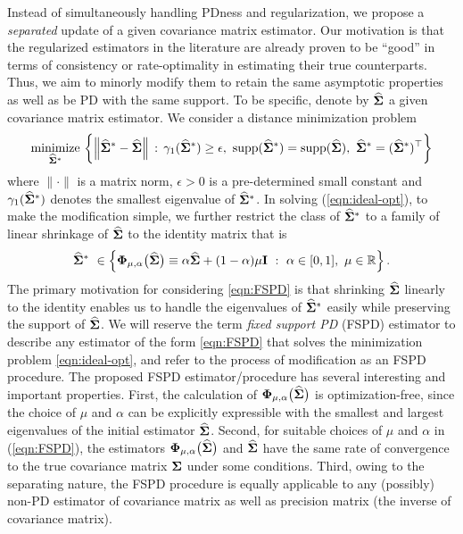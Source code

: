 \documentclass[times,sort&compress,3p]{elsarticle}
\newcommand{\minimize}{\mathop{\rm minimize}}
\begin{document}
Instead of simultaneously handling PDness and regularization, we propose a \emph{separated} update of a given 
covariance matrix estimator. 
Our motivation is that the regularized estimators in the literature are already proven to be ``good'' in terms of
consistency or rate-optimality in estimating their true counterparts. Thus, we aim to
minorly modify them to retain the same asymptotic properties as well as be PD with the same support. To be specific,
denote by $\widehat{\bf \Sigma}$ a given covariance matrix estimator.
We consider a distance minimization problem
\begin{equation} \label{eqn:ideal-opt}
\minimize_{\widehat{\bf \Sigma}^*}\,
\bigg\{ \Big\| \widehat{\bf \Sigma}^* - \widehat{\bf \Sigma} \Big\| \,:\,
	\gamma_{1}(\widehat{\bf \Sigma}^*) \geq \epsilon
	,~ {\rm supp}(\widehat{\bf \Sigma}^*) = {\rm supp}(\widehat{\bf \Sigma})
	, ~ \widehat{\bf \Sigma}^* = (\widehat{\bf \Sigma}^*)^{\top}
\bigg\}
\end{equation}
where $\|\cdot\|$ is a matrix norm,  $\epsilon >0$ is a pre-determined small constant and $\gamma_{1}(\widehat{\bf \Sigma}^*)$ denotes the smallest
eigenvalue of
$\widehat{\bf \Sigma}^*$.
In solving (\ref{eqn:ideal-opt}), to make the modification simple, we further restrict the class of $\widehat{\bf \Sigma}^*$ to
a family of linear
shrinkage of $\widehat{\bf \Sigma}$ to the identity
matrix that is
\begin{equation} \label{eqn:FSPD}
\widehat{\bf \Sigma}^* ~ \in \left\{ {\bf \Phi}_{\mu, \alpha}\big(\widehat{\bf \Sigma}\big) \equiv \alpha
\widehat{\bf \Sigma} + (1 - \alpha) \mu {\bf I} ~:~ \alpha \in [0,1], ~\mu \in \mathbb{R} \right\}.
\end{equation}
The primary motivation for considering \eqref{eqn:FSPD} is that shrinking $\widehat{\bf \Sigma}$ linearly to the identity enables us to
handle the eigenvalues of $\widehat{\bf \Sigma}^*$ easily while preserving the support of
$\widehat{\bf \Sigma}$.
We will reserve  the term \emph{fixed support PD} (FSPD) estimator to describe any  estimator of the form \eqref{eqn:FSPD} that solves the minimization problem \eqref{eqn:ideal-opt}, and refer to the process of
 modification as an FSPD procedure.
The proposed FSPD estimator/procedure has several interesting and important  properties.
 First, 
the calculation of ${\bf \Phi}_{\mu, \alpha}\big(\widehat{\bf \Sigma}\big)$ is optimization-free, since the choice of $\mu$ and $\alpha$ can be explicitly expressible with the smallest and largest eigenvalues of the initial estimator  $\widehat{\bf \Sigma}$. Second, for suitable choices of $\mu$ and $\alpha$ in (\ref{eqn:FSPD}), the  estimators ${\bf \Phi}_{\mu, \alpha}\big(\widehat{\bf \Sigma}\big)$  and $\widehat{\bf \Sigma}$ have the same  rate of convergence to the true covariance matrix $\bf \Sigma$ under some conditions. Third, owing to the separating nature, the FSPD procedure is equally applicable to any (possibly)  non-PD estimator of covariance matrix as well as precision matrix (the inverse of covariance matrix).
\end{document}
